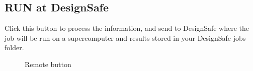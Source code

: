 \subsection{RUN at DesignSafe}
Click this button to process the information, and send to DesignSafe where the job will be run on a supercomputer and results stored in your DesignSafe jobs folder.

\begin{figure}[!htbp]
  \caption{Remote button}
  \label{fig:figure16}
\end{figure}

